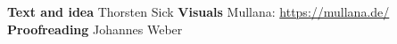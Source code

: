 \newpage
\begin{center}
\textbf{Text and idea}
\newline
Thorsten Sick
\newline
\textbf{Visuals}
\newline
Mullana: \url{https://mullana.de/}
\newline
\textbf{Proofreading}
\newline
Johannes Weber
\newline
\end{center}
\newpage
